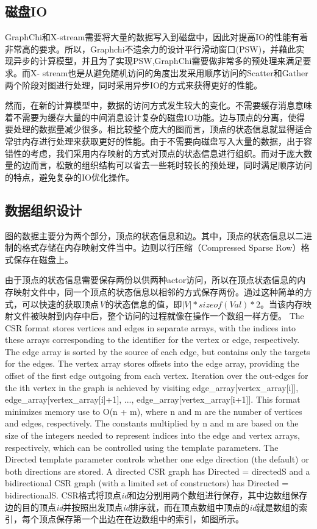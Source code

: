 \subsection{磁盘IO}
GraphChi和X-stream需要将大量的数据写入到磁盘中，因此对提高IO的性能有着非常高的要求。所以，Graphchi不遗余力的设计平行滑动窗口(PSW)，并藉此实现异步的计算模型，并且为了实现PSW,GraphChi需要做非常多的预处理来满足要求。而X- stream也是从避免随机访问的角度出发采用顺序访问的Scatter和Gather两个阶段对图进行处理，同时采用异步IO的方式来获得更好的性能。

然而，在新的计算模型中，数据的访问方式发生较大的变化。不需要缓存消息意味着不需要为缓存大量的中间消息设计复杂的磁盘IO功能。边与顶点的分离，使得要处理的数据量减少很多。相比较整个庞大的图而言，顶点的状态信息就显得适合常驻内存进行处理来获取更好的性能。由于不需要向磁盘写入大量的数据，出于容错性的考虑，我们采用内存映射的方式对顶点的状态信息进行组织。而对于庞大数量的边而言，松散的组织结构可以省去一些耗时较长的预处理，同时满足顺序访问的特点，避免复杂的IO优化操作。

\subsection{数据组织设计}
图的数据主要分为两个部分，顶点的状态信息和边。其中，顶点的状态信息以二进制的格式存储在内存映射文件当中。边则以行压缩（Compressed Sparse Row）格式保存在磁盘上。

由于顶点的状态信息需要保存两份以供两种actor访问，所以在顶点状态信息的内存映射文件中，同一个顶点的状态信息以相邻的方式保存两份。通过这种简单的方式，可以快速的获取顶点\textit{V}的状态信息的值，即$|V| * sizeof(Val)*2$。当该内存映射文件被映射到内存中后，整个访问的过程就像在操作一个数组一样方便。
The CSR format stores vertices and edges in separate arrays, with the indices into these arrays corresponding to the identifier for the vertex or edge, respectively. The edge array is sorted by the source of each edge, but contains only the targets for the edges. The vertex array stores offsets into the edge array, providing the offset of the first edge outgoing from each vertex. Iteration over the out-edges for the ith vertex in the graph is achieved by visiting edge_array[vertex_array[i]], edge_array[vertex_array[i]+1], ..., edge_array[vertex_array[i+1]]. This format minimizes memory use to O(n + m), where n and m are the number of vertices and edges, respectively. The constants multiplied by n and m are based on the size of the integers needed to represent indices into the edge and vertex arrays, respectively, which can be controlled using the template parameters. The Directed template parameter controls whether one edge direction (the default) or both directions are stored. A directed CSR graph has Directed = directedS and a bidirectional CSR graph (with a limited set of constructors) has Directed = bidirectionalS.
CSR格式将顶点\textit{id}和边分别用两个数组进行保存，其中边数组保存边的目的顶点\textit{id}并按照出发顶点\textit{id}排序就，而在顶点数组中顶点的\textit{id}就是数组的索引，每个顶点保存第一个出边在在边数组中的索引，如图所示。


